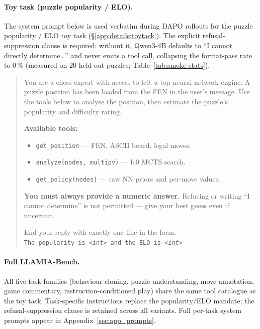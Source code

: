 \paragraph{Toy task (puzzle popularity / ELO).}
The system prompt below is used verbatim during DAPO rollouts for the puzzle
popularity / ELO toy task (\S\ref{app:details:toytask}).
The explicit refusal-suppression clause is required: without it, Qwen3-4B
defaults to ``I cannot directly determine\ldots'' and never emits a tool call,
collapsing the format-pass rate to 0\,\% (measured on 20 held-out puzzles;
Table~\ref{tab:smoke-stats}).

\begin{tcolorbox}[promptbox,
  title={$\triangleright$\; Stage~2 System Prompt --- Puzzle Popularity / ELO (DAPO Rollouts)},
  label={box:stage2grpo}]
\begin{quote}
You are a chess expert with access to lc0, a top neural network engine.
A puzzle position has been loaded from the FEN in the user's message.
Use the tools below to analyse the position, then estimate the puzzle's
popularity and difficulty rating.

\smallskip
\textbf{Available tools:}
\begin{itemize}[noitemsep,topsep=1pt,leftmargin=14pt]
  \item \texttt{get\_position} --- FEN, ASCII board, legal moves.
  \item \texttt{analyze(nodes, multipv)} --- lc0 MCTS search.
  \item \texttt{get\_policy(nodes)} --- raw NN priors and per-move values.
\end{itemize}

\smallskip
\textbf{You must always provide a numeric answer.}
Refusing or writing ``I cannot determine'' is not permitted ---
give your best guess even if uncertain.

\smallskip
End your reply with exactly one line in the form:\\[2pt]
\texttt{The popularity is \textit{<int>} and the ELO is \textit{<int>}}
\end{quote}
\end{tcolorbox}

\paragraph{Full LLAMIA-Bench.}
All five task families (behaviour cloning, puzzle understanding, move
annotation, game commentary, instruction-conditioned play) share the same tool
catalogue as the toy task.
Task-specific instructions replace the popularity/ELO mandate; the refusal-suppression
clause is retained across all variants.
Full per-task system prompts appear in Appendix~\ref{sec:app_prompts}.

